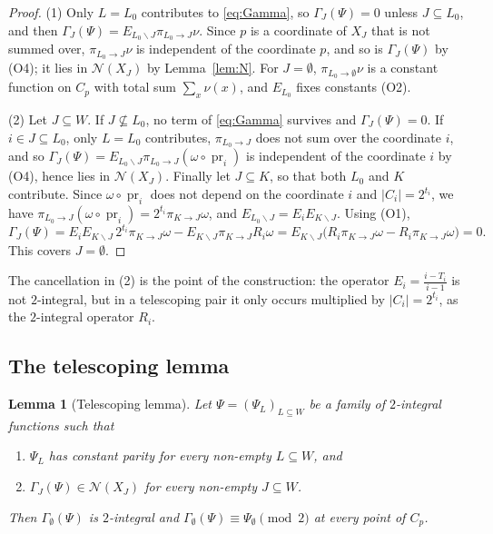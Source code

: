 \documentclass[11pt]{amsart}
\newtheorem{lemma}[theorem]{Lemma}
\theoremstyle{definition}
\theoremstyle{remark}
\newcommand{\Nn}{\mathcal N}
\DeclareMathOperator{\pr}{pr}
\numberwithin{equation}{section}
\begin{document}
\begin{proof}
(1) Only $L=L_0$ contributes to \eqref{eq:Gamma}, so $\Gamma_J(\Psi)=0$ unless $J\subseteq L_0$, and then $\Gamma_J(\Psi)=E_{L_0\smallsetminus J}\pi_{L_0\to J}\nu$.
Since $p$ is a coordinate of $X_J$ that is not summed over, $\pi_{L_0\to J}\nu$ is independent of the coordinate $p$, and so is $\Gamma_J(\Psi)$ by (O4); it lies in $\Nn(X_J)$ by Lemma~\ref{lem:N}.
For $J=\emptyset$, $\pi_{L_0\to\emptyset}\nu$ is a constant function on $C_p$ with total sum $\sum_x\nu(x)$, and $E_{L_0}$ fixes constants (O2).

(2) Let $J\subseteq W$.
If $J\not\subseteq L_0$, no term of \eqref{eq:Gamma} survives and $\Gamma_J(\Psi)=0$.
If $i\in J\subseteq L_0$, only $L=L_0$ contributes, $\pi_{L_0\to J}$ does not sum over the coordinate $i$, and so $\Gamma_J(\Psi)=E_{L_0\smallsetminus J}\pi_{L_0\to J}(\omega\circ\pr_i)$ is independent of the coordinate $i$ by (O4), hence lies in $\Nn(X_J)$.
Finally let $J\subseteq K$, so that both $L_0$ and $K$ contribute.
Since $\omega\circ\pr_i$ does not depend on the coordinate $i$ and $|C_i|=2^{t_i}$, we have $\pi_{L_0\to J}(\omega\circ\pr_i)=2^{t_i}\pi_{K\to J}\omega$, and $E_{L_0\smallsetminus J}=E_iE_{K\smallsetminus J}$.
Using (O1),
\[
\Gamma_J(\Psi)=E_iE_{K\smallsetminus J}\,2^{t_i}\pi_{K\to J}\omega-E_{K\smallsetminus J}\pi_{K\to J}R_i\omega
=E_{K\smallsetminus J}\bigl(R_i\pi_{K\to J}\omega-R_i\pi_{K\to J}\omega\bigr)=0 .
\]
This covers $J=\emptyset$.
\end{proof}

The cancellation in (2) is the point of the construction: the operator $E_i=\frac{i-T_i}{i-1}$ is not $2$-integral, but in a telescoping pair it only occurs multiplied by $|C_i|=2^{t_i}$, as the $2$-integral operator $R_i$.

\subsection{The telescoping lemma}

\begin{lemma}[Telescoping lemma]\label{lem:telescope}
Let $\Psi=(\Psi_L)_{L\subseteq W}$ be a family of $2$-integral functions such that
\begin{enumerate}
\item[(i)] $\Psi_L$ has constant parity for every non-empty $L\subseteq W$, and
\item[(ii)] $\Gamma_J(\Psi)\in\Nn(X_J)$ for every non-empty $J\subseteq W$.
\end{enumerate}
Then $\Gamma_\emptyset(\Psi)$ is $2$-integral and $\Gamma_\emptyset(\Psi)\equiv\Psi_\emptyset\pmod 2$ at every point of $C_p$.
\end{lemma}
\end{document}
